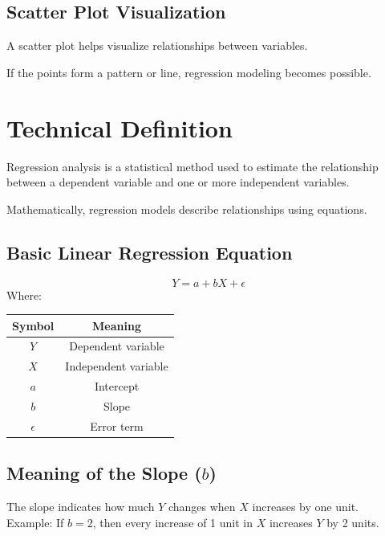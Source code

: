 \documentclass[12pt,a4paper]{article}
\begin{document}
	\subsection{Scatter Plot Visualization}
	A scatter plot helps visualize relationships between variables.
	
	\begin{center}
	\end{center}
	
	If the points form a pattern or line, regression modeling becomes possible.
	
	\section{Technical Definition}
	Regression analysis is a statistical method used to estimate the relationship between a dependent variable and one or more independent variables.
	
	Mathematically, regression models describe relationships using equations.
	
	\subsection{Basic Linear Regression Equation}
	\[
	Y = a + bX + \epsilon
	\]
	Where:
	\begin{table}[h!]
		\centering
		\begin{tabular}{|c|c|}
			\hline
			\textbf{Symbol} & \textbf{Meaning} \\
			\hline
			$Y$ & Dependent variable \\
			$X$ & Independent variable \\
			$a$ & Intercept \\
			$b$ & Slope \\
			$\epsilon$ & Error term \\
			\hline
		\end{tabular}
	\end{table}
	
	\subsection{Meaning of the Slope ($b$)}
	The slope indicates how much $Y$ changes when $X$ increases by one unit.\\
	Example: If $b = 2$, then every increase of 1 unit in $X$ increases $Y$ by 2 units.
	
\end{document}

